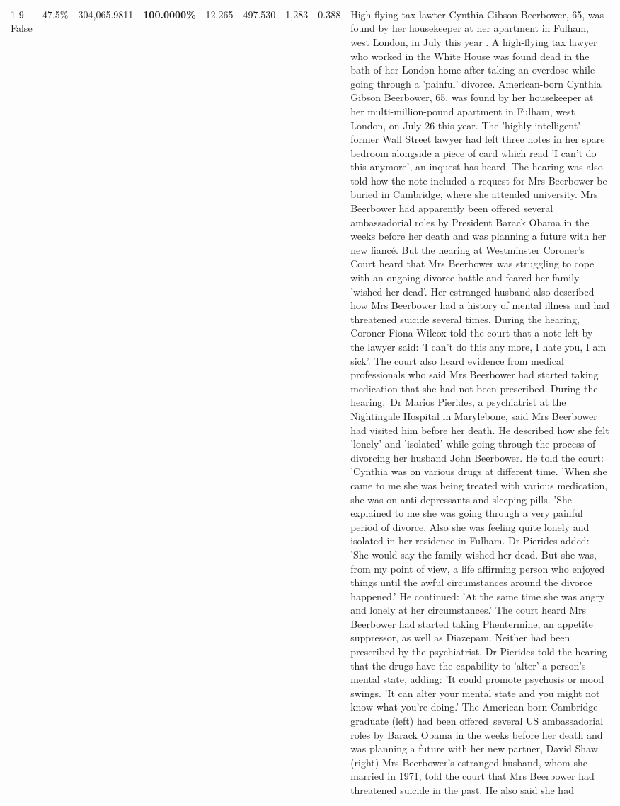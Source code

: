\begin{table}[H]
\begin{tabular}{lllrlllll}
\cline{1-9}
False & 47.5\% & \color{red} 304,065.9811 & \bfseries \color{red} 100.0000\% & 12.265 & 497.530 & 1,283 & 0.388 & High-flying tax lawter Cynthia Gibson Beerbower, 65, was found by her housekeeper at her apartment in Fulham, west London, in July this year . A high-flying tax lawyer who worked in the White House was found dead in the bath of her London home after taking an overdose while going through a 'painful' divorce. American-born Cynthia Gibson Beerbower, 65, was found by her housekeeper at her multi-million-pound apartment in Fulham, west London, on July 26 this year. The 'highly intelligent' former Wall Street lawyer had left three notes in her spare bedroom alongside a piece of card which read 'I can't do this anymore', an inquest has heard. The hearing was also told how the note included a request for Mrs Beerbower be buried in Cambridge, where she attended university. Mrs Beerbower had apparently been offered several ambassadorial roles by President Barack Obama in the weeks before her death and was planning a future with her new fiancé. But the hearing at Westminster Coroner's Court heard that Mrs Beerbower was struggling to cope with an ongoing divorce battle and feared her family 'wished her dead'. Her estranged husband also described how Mrs Beerbower had a history of mental illness and had threatened suicide several times. During the hearing, Coroner Fiona Wilcox told the court that a note left by the lawyer said: 'I can't do this any more, I hate you, I am sick'. The court also heard evidence from medical professionals who said Mrs Beerbower had started taking medication that she had not been prescribed. During the hearing, Dr Marios Pierides, a psychiatrist at the Nightingale Hospital in Marylebone, said Mrs Beerbower had visited him before her death. He described how she felt 'lonely' and 'isolated' while going through the process of divorcing her husband John Beerbower. He told the court: 'Cynthia was on various drugs at different time. 'When she came to me she was being treated with various medication, she was on anti-depressants and sleeping pills. 'She explained to me she was going through a very painful period of divorce. Also she was feeling quite lonely and isolated in her residence in Fulham. Dr Pierides added: 'She would say the family wished her dead. But she was, from my point of view, a life affirming person who enjoyed things until the awful circumstances around the divorce happened.' He continued: 'At the same time she was angry and lonely at her circumstances.' The court heard Mrs Beerbower had started taking Phentermine, an appetite suppressor, as well as Diazepam. Neither had been prescribed by the psychiatrist. Dr Pierides told the hearing that the drugs have the capability to 'alter' a person's mental state, adding: 'It could promote psychosis or mood swings. 'It can alter your mental state and you might not know what you're doing.' The American-born Cambridge graduate (left) had been offered several US ambassadorial roles by Barack Obama in the weeks before her death and was planning a future with her new partner, David Shaw (right) Mrs Beerbower's estranged husband, whom she married in 1971, told the court that Mrs Beerbower had threatened suicide in the past. He also said she had 
\end{tabular}
\end{table}
